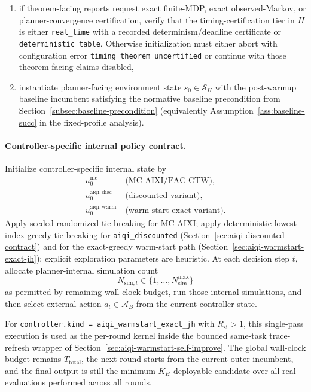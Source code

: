 \documentclass[11pt]{article}
\begin{document}
\begin{enumerate}
    $\Psi_H$. If theorem-facing reports request such claims without the
    certificate, initialization must either abort with configuration error
    \texttt{exact\allowbreak\_state\allowbreak\_observation\allowbreak\_uncertified} or continue with those
    claims disabled,
    \item if theorem-facing reports request exact finite-MDP,
    exact observed-Markov, or planner-convergence certification, verify that
    the timing-certification tier in $H$ is either
    \texttt{real\_time} with a recorded determinism/deadline certificate or
    \texttt{deterministic\_table}. Otherwise initialization must either abort
    with configuration error
    \texttt{timing\allowbreak\_theorem\allowbreak\_uncertified} or continue
    with those theorem-facing claims disabled,
    \item instantiate planner-facing environment state $s_0\in\mathcal{S}_H$
    with the post-warmup baseline incumbent satisfying the normative baseline
    precondition from Section~\ref{subsec:baseline-precondition}
    (equivalently Assumption~\ref{ass:baseline-succ} in the fixed-profile
    analysis).
\end{enumerate}

\paragraph{Controller-specific internal policy contract.}
Initialize controller-specific internal state by
\[
\begin{aligned}
u_0^{\mathrm{mc}}&\ \text{(MC-AIXI/FAC-CTW)},\\
u_0^{\mathrm{aiqi,disc}}&\ \text{(discounted variant)},\\
u_0^{\mathrm{aiqi,warm}}&\ \text{(warm-start exact variant)}.
\end{aligned}
\]
Apply seeded randomized tie-breaking for MC-AIXI; apply deterministic
lowest-index greedy tie-breaking for \texttt{aiqi\_discounted}
(Section~\ref{sec:aiqi-discounted-contract}) and for the exact-greedy
warm-start path (Section~\ref{sec:aiqi-warmstart-exact-jh}); explicit
exploration parameters are heuristic. At each decision step $t$, allocate
planner-internal simulation count
\[
N_{\mathrm{sim},t}\in\{1,\dots,N_{\mathrm{sim}}^{\max}\}
\]
as permitted by remaining wall-clock budget, run those internal simulations,
and then select external action $a_t\in\mathcal{A}_B$ from the current
controller state.

For \texttt{controller.kind = aiqi\_warmstart\_exact\allowbreak\_jh} with
$R_{\mathrm{si}}>1$, this single-pass execution is used as the per-round
kernel inside the bounded same-task trace-refresh wrapper of
Section~\ref{sec:aiqi-warmstart-self-improve}. The global wall-clock budget
remains $T_{\mathrm{total}}$, the next round starts from the current outer
incumbent, and the final output is still the minimum-$K_H$ deployable candidate
over all real evaluations performed across all rounds.
\end{document}
